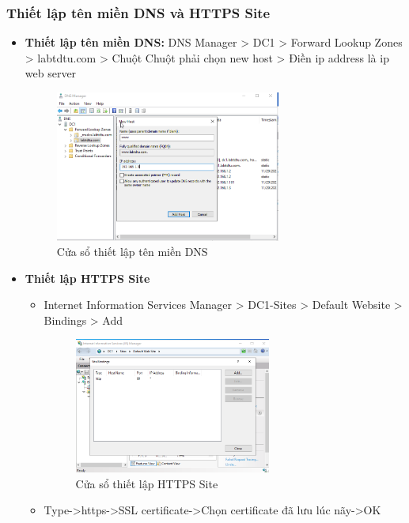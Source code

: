 \documentclass[13pt]{report}
\begin{document}
	\subsubsection{Thiết lập tên miền DNS và HTTPS Site}
	\begin{itemize}
		\item \textbf{Thiết lập tên miền DNS:} DNS Manager > DC1 > Forward Lookup Zones > labtdtu.com > Chuột Chuột phải chọn new host > Điền ip address là ip web server
		\begin{figure}[htp]
			\centering
			\includegraphics[width=0.7\textwidth]{image/Gui/DNS.png}
			\caption{Cửa sổ thiết lập tên miền DNS}
		\end{figure}
		\newpage
		\item \textbf{Thiết lập HTTPS Site}
		\begin{itemize}
			\item Internet Information Services Manager > DC1-Sites > Default Website > Bindings > Add
			\begin{figure}[htp]
				\centering
				\includegraphics[width=0.65\textwidth]{image/Gui/Https01.png}
				\caption{Cửa sổ thiết lập HTTPS Site}
			\end{figure}
			\item Type->https->SSL certificate->Chọn certificate đã lưu lúc nãy->OK
			\begin{figure}[htp]

\end{figure}
\end{itemize}
\end{itemize}
\end{document}
